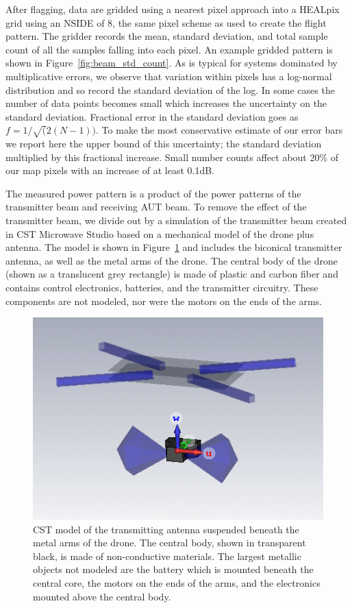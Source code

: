 \documentclass[preprint2,numberedappendix,tighten,twocolappendix]{aastex6}
\begin{document}
After flagging, data are gridded using a nearest pixel approach into a HEALpix grid using an NSIDE of 8, the same pixel scheme as used to create the flight pattern.  The gridder records the mean, standard deviation, and total sample count of all the samples falling into each pixel. An example gridded pattern is shown in Figure~\ref{fig:beam_std_count}.
  As is typical for systems dominated by multiplicative errors, we observe that variation within pixels has a log-normal distribution and so record the standard deviation of the log.  In some cases the number of data points becomes small which increases the uncertainty on the standard deviation. Fractional error in the standard deviation goes as $f=1/\sqrt(2(N-1))$. To make the most conservative estimate of our error bars we report here the upper bound of this uncertainty; the standard deviation multiplied by this fractional increase. Small number counts affect about 20\% of our map pixels with an increase of at least 0.1dB.


The measured power pattern is a product of the power patterns of the transmitter beam and receiving AUT beam. To remove the effect of the transmitter beam, we divide out by a simulation of the transmitter beam created in CST Microwave Studio based on a mechanical model of the drone plus antenna. The model is shown in Figure~\ref{fig:tx_cst} and includes the biconical transmitter antenna, as well as the metal arms of the drone.  The central body of the drone (shown as a translucent grey rectangle) is made of plastic and carbon fiber and contains control electronics, batteries, and the transmitter circuitry. These components are not modeled, nor were the motors on the ends of the arms.   

\begin{figure}
\includegraphics[width=\columnwidth]{figures/drone_antenna_screenshot.png}
\caption{CST model of the transmitting antenna suspended beneath the metal arms of the drone. The central body, shown in transparent black, is made of non-conductive materials. The largest metallic objects not modeled are the battery which is mounted beneath the central core, the motors on the ends of the arms, and the electronics mounted above the central body.}\label{fig:tx_cst}
\end{figure}
\end{document}
